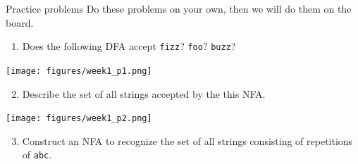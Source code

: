 \begin{frame}[fragile]{Practice problems}
\protect\hypertarget{practice-problems}{}
Do these problems on your own, then we will do them on the board.

\begin{enumerate}
[1)]
\tightlist
\item
  Does the following DFA accept \texttt{fizz}? \texttt{foo}?
  \texttt{buzz}?
\end{enumerate}

\texttt{[image: figures/week1\_p1.png]}

\begin{enumerate}
[1)]
\setcounter{enumi}{1}
\tightlist
\item
  Describe the set of all strings accepted by the this NFA.
\end{enumerate}

\texttt{[image: figures/week1\_p2.png]}

\begin{enumerate}
[1)]
\setcounter{enumi}{2}
\tightlist
\item
  Construct an NFA to recognize the set of all strings consisting of
  repetitions of \texttt{abc}.
\end{enumerate}
\end{frame}

